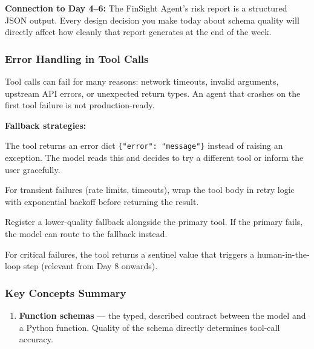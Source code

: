 \documentclass[12pt, a4paper]{article}
\newcommand{\kterm}[1]{\textbf{\textcolor{keyterm}{#1}}}
\begin{document}
\begin{theorybox}
\begin{notebox}
\textbf{Connection to Day 4--6:} The FinSight Agent's risk report is a structured JSON output. Every design decision you make today about schema quality will directly affect how cleanly that report generates at the end of the week.
\end{notebox}

\subsubsection*{Error Handling in Tool Calls}

Tool calls can fail for many reasons: network timeouts, invalid arguments, upstream API errors, or unexpected return types. An agent that crashes on the first tool failure is not production-ready.

\medskip

\noindent\textbf{Fallback strategies:}

\begin{description}[leftmargin=3.5cm, style=nextline, font=\bfseries\color{keyterm}]
  \item[Graceful degradation] The tool returns an error dict \texttt{\{"error": "message"\}} instead of raising an exception. The model reads this and decides to try a different tool or inform the user gracefully.
  \item[Retry with backoff] For transient failures (rate limits, timeouts), wrap the tool body in retry logic with exponential backoff before returning the result.
  \item[Fallback tool] Register a lower-quality fallback alongside the primary tool. If the primary fails, the model can route to the fallback instead.
  \item[Human escalation] For critical failures, the tool returns a sentinel value that triggers a human-in-the-loop step (relevant from Day 8 onwards).
\end{description}

\subsubsection*{Key Concepts Summary}

\begin{enumerate}[leftmargin=*, label=\textbf{\arabic*.}, itemsep=4pt]
  \item \kterm{Function schemas} --- the typed, described contract between the model and a Python function. Quality of the schema directly determines tool-call accuracy.


\end{enumerate}
\end{theorybox}
\end{document}
